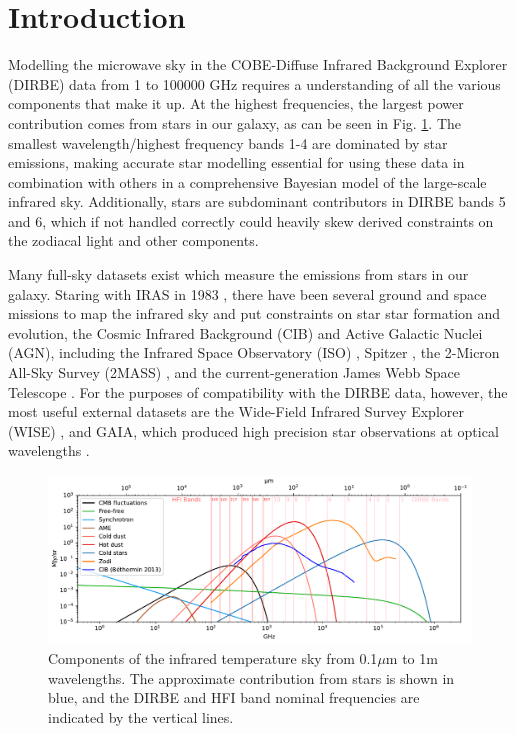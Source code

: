 \documentclass{aa}
\begin{document}
\section{Introduction}

Modelling the microwave sky in the COBE-Diffuse Infrared Background Explorer (DIRBE) data  \citep{DIRBE} from 1 to 100000 GHz requires a  understanding of all the various components that make it up. At the highest frequencies, the largest power contribution comes from stars in our galaxy, as can be seen in Fig. \ref{fig:sed}. The smallest wavelength/highest frequency bands 1-4 are dominated by star emissions, making accurate star modelling essential for using these data in combination with others in a comprehensive Bayesian model of the large-scale infrared sky. Additionally, stars are subdominant contributors in DIRBE bands 5 and 6, which if not handled correctly could heavily skew derived constraints on the zodiacal light and other components.

Many full-sky datasets exist which measure the emissions from stars in our galaxy. Staring with IRAS in 1983 \citep{iras}, there have been several ground and space missions to map the infrared sky and put constraints on star star formation and evolution, the Cosmic Infrared Background (CIB) and Active Galactic Nuclei (AGN), including the Infrared Space Observatory (ISO) \citep{iso}, Spitzer \citep{spitzer}, the 2-Micron All-Sky Survey (2MASS) \citep{2mass}, and the current-generation James Webb Space Telescope \citep{jwst}. For the purposes of compatibility with the DIRBE data, however, the most useful external datasets are the Wide-Field Infrared Survey Explorer (WISE) \citep{wise}, and GAIA, which produced high precision star observations at optical wavelengths \citep{gaia}. 

\begin{figure}
  \centering
  \includegraphics[width=\textwidth]{figs/sed/all_fgs.pdf}
  \caption{Components of the infrared temperature sky from 0.1$\mu$m to 1m wavelengths. The approximate contribution from stars is shown in blue, and the DIRBE and HFI band nominal frequencies are indicated by the vertical lines.}
  \label{fig:sed}
\end{figure}
\end{document}
